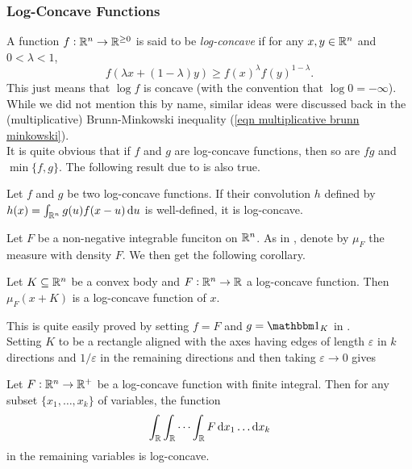 \subsubsection{Log-Concave Functions}

A function $f:\mathbb{R}^n\to\mathbb{R}^{\geq 0}$ is said to be \textit{log-concave} if for any $x,y\in\mathbb{R}^n$ and $0<\lambda<1$,
\[ f(\lambda x + (1-\lambda)y) \geq f(x)^\lambda f(y)^{1-\lambda}. \]
This just means that $\log f$ is concave (with the convention that $\log 0 = -\infty$). While we did not mention this by name, similar ideas were discussed back in the (multiplicative) Brunn-Minkowski inequality (\ref{eqn multiplicative brunn minkowski}).\\

It is quite obvious that if $f$ and $g$ are log-concave functions, then so are $fg$ and $\min\{f,g\}$. The following result due to \cite{Prkopa1973OnLC} is also true.

\begin{lemma}
\label{convolution of log concave functions is log concave}
	Let $f$ and $g$ be two log-concave functions. If their convolution $h$ defined by $h(x)=\int_{\mathbb{R}^n}g(u)f(x-u)\operatorname{d}\!{u}$ is well-defined, it is log-concave.
\end{lemma}

Let $F$ be a non-negative integrable funciton on $\mathbb{R}^n$. As in , denote by $\mu_F$ the measure with density $F$. We then get the following corollary.

\begin{corollary}
\label{F(x+K) log concave K convex}
	Let $K\subseteq\mathbb{R}^n$ be a convex body and $F:\mathbb{R}^n\to\mathbb{R}$ a log-concave function. Then $\mu_F(x+K)$ is a log-concave function of $x$.
\end{corollary}

This is quite easily proved by setting $f=F$ and $g=\indic_K$ in .\\

Setting $K$ to be a rectangle aligned with the axes having edges of length $\varepsilon$ in $k$ directions and $1/\varepsilon$ in the remaining directions and then taking $\varepsilon\to 0$ gives

\begin{corollary}
	\label{cor: 4.30}
	Let $F:\mathbb{R}^n\to\mathbb{R}^+$ be a log-concave function with finite integral. Then for any subset $\{x_1,\ldots,x_k\}$ of variables, the function
	\[ \int_{\mathbb{R}} \int_{\mathbb{R}} \cdots \int_{\mathbb{R}} F \operatorname{d}\!{x}_1\ldots\operatorname{d}\!{x_k} \]
	in the remaining variables is log-concave.
\end{corollary}


